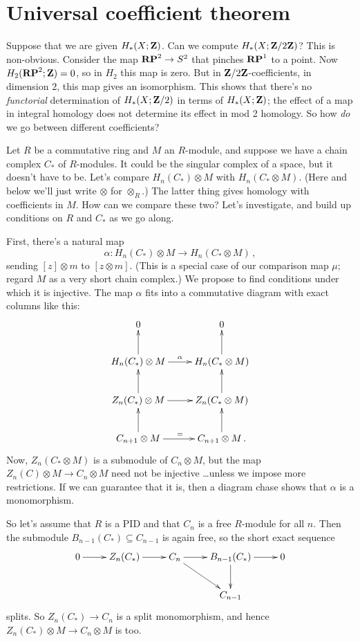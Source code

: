 \section{Universal coefficient theorem}

Suppose that we are given $ H_\ast(X;\mathbf Z)$. Can we compute $ H_\ast(X;\mathbf Z/2\mathbf Z)$? 
This is non-obvious. Consider the map $\mathbf{RP}^2\to S^2$ that pinches $\mathbf{RP}^1$ to a point. Now $H_2(\mathbf{RP}^2;\mathbf Z)=0$, so in $H_2$ this map is zero. But in $\mathbf Z/2\mathbf Z$-coefficients, in dimension $2$, this map gives an isomorphism. This shows that there's no {\em functorial} determination of $ H_\ast(X;\mathbf Z/2)$ in terms of $ H_\ast(X;\mathbf Z)$; the effect of a map in integral homology does not determine its effect in mod 2 homology. So how \emph{do} we go between different coefficients?

Let $R$ be a commutative ring and $M$ an $R$-module, and suppose we have a chain complex $C_\ast$ of $R$-modules. It could be the singular complex of a space, but it doesn't have to be. Let's compare $ H_n(C_\ast)\otimes M$ with $ H_n(C_\ast\otimes M)$. (Here and below we'll just write $\otimes$ for $\otimes_R$.) The latter thing gives homology with coefficients in $M$. How can we compare these two? Let's investigate, and build up conditions on $R$ and $C_\ast$ as we go along. 

First, there's a natural map 
\[
\alpha: H_n(C_\ast)\otimes M\to H_n(C_\ast\otimes M)\,,
\]
sending $[z]\otimes m$ to $[z\otimes m]$. (This is a special case
of our comparison map $\mu$; regard $M$ as a very short chain complex.) 
We propose to find conditions under which it is 
injective. The map $\alpha$ fits into a commutative 
diagram with exact columns like this:
\[
\xymatrix{
0 & 0 \\
H_n(C_*)\otimes M \ar[r]^\alpha \ar[u] & H_n(C_*\otimes M) \ar[u] \\
Z_n(C_*)\otimes M \ar[r] \ar[u] & Z_n(C_*\otimes M) \ar[u] \\
C_{n+1}\otimes M \ar[r]^= \ar[u] & C_{n+1}\otimes M \ar[u] \,.
}\]
Now, $Z_n(C_*\otimes M)$ is a submodule of $C_n\otimes M$, but the map
$Z_n(C)\otimes M\to C_n\otimes M$ need not be injective \ldots unless we impose more
restrictions. If we can guarantee that it is, then a diagram chase shows
that $\alpha$ is a monomorphism. 

So let's assume that $R$ is a PID and that $C_n$ is a free $R$-module for 
all $n$. Then the submodule $B_{n-1}(C_*)\subseteq C_{n-1}$ is again free, 
so the short exact sequence 
\[
\xymatrix{
0 \ar[r] & Z_n(C_*) \ar[r] & C_n \ar[r] \ar[dr] & 
B_{n-1}(C_*) \ar[r] \ar[d] & 0 \\
&&& C_{n-1} 
}\]
splits. So $Z_n(C_*)\to C_n$ is a split monomorphism, and hence 
$Z_n(C_*)\otimes M\to C_n\otimes M$ is too. 

